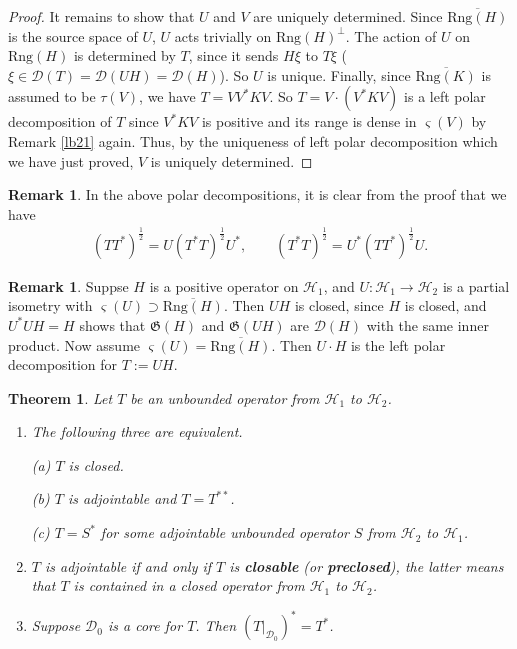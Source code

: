 \documentclass[12pt,b5paper,notitlepage]{article}
\theoremstyle{definition}
\newtheorem{rem}[df]{Remark}
\theoremstyle{plain}
\newtheorem{thm}[df]{Theorem}
\newcommand{\fk}{\mathfrak}
\newcommand{\mc}{\mathcal}
\newcommand{\ovl}{\overline}
\newcommand{\Dom}{\scr D}
\newcommand{\scr}{\mathscr}
\newcommand{\sgm}{\varsigma}
\newcommand{\Rng}{\mathrm{Rng}}
\numberwithin{equation}{section}
\begin{document}
\begin{proof}
It remains to show that $U$ and $V$ are uniquely determined. Since $\ovl{\Rng(H)}$ is the source space of $U$, $U$ acts trivially on $\Rng(H)^\perp$. The action of $U$ on $\Rng(H)$ is determined by $T$, since it sends $H\xi$ to $T\xi$ ($\xi\in\Dom(T)=\Dom(UH)=\Dom(H)$). So $U$ is unique. Finally, since $\ovl{\Rng(K)}$ is assumed to be $\tau(V)$, we have $T=VV^*KV$. So $T=V\cdot (V^*KV)$ is a left polar decomposition of $T$ since $V^*KV$ is positive and its range is dense in $\sgm(V)$ by Remark \ref{lb21} again. Thus, by the uniqueness of left polar decomposition which we have just proved, $V$ is uniquely determined.
\end{proof}


\begin{rem}\label{lb32}
In the above polar decompositions, it is clear from the proof that we have
\begin{align*}
(TT^*)^{\frac 12}=U(T^*T)^{\frac 12}U^*,\qquad (T^*T)^{\frac 12}=U^*(TT^*)^{\frac 12}U.	
\end{align*}
\end{rem}




\begin{rem}\label{lb45}
Suppse $H$ is a positive operator on $\mc H_1$, and $U:\mc H_1\rightarrow\mc H_2$ is a partial isometry with $\sgm(U)\supset \ovl{\Rng(H)}$. Then $UH$ is closed, since $H$ is closed, and  $U^*UH=H$ shows that $\fk G(H)$ and $\fk G(UH)$ are $\Dom(H)$ with the same inner product. Now assume $\sgm(U)=\ovl{\Rng(H)}$. Then  $U\cdot H$ is the left polar decomposition for $T:=UH$.
\end{rem}



\begin{thm}\label{lb24}
Let $T$ be an unbounded operator from $\mc H_1$ to $\mc H_2$.
\begin{enumerate}
\item The following three are equivalent.

(a) $T$ is closed.

(b) $T$ is adjointable and $T=T^{**}$.

(c) $T=S^*$ for some adjointable unbounded operator $S$ from $\mc H_2$ to $\mc H_1$.

\item $T$ is adjointable if and only if $T$ is \textbf{closable} (or \textbf{preclosed}), the latter means that $T$ is contained in a closed operator from $\mc H_1$ to $\mc H_2$.

\item Suppose $\Dom_0$ is a core for $T$. Then $(T|_{\Dom_0})^*=T^*$.


\end{enumerate}
\end{thm}
\end{document}
